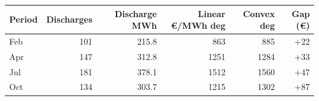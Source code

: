\begin{tabular}{lrrrrr}
\toprule
Period & Discharges & Discharge MWh & Linear €/MWh deg & Convex deg & Gap (€) \\
\midrule
Feb & 101 & 215.8 & 863 & 885 & +22 \\
Apr & 147 & 312.8 & 1251 & 1284 & +33 \\
Jul & 181 & 378.1 & 1512 & 1560 & +47 \\
Oct & 134 & 303.7 & 1215 & 1302 & +87 \\
\bottomrule
\end{tabular}
